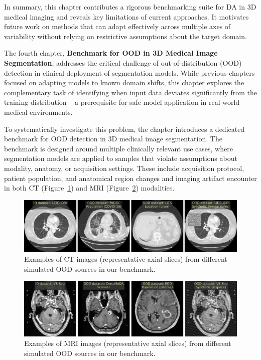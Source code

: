 In summary, this chapter contributes a rigorous benchmarking suite for DA in 3D medical imaging and reveals key limitations of current approaches. It motivates future work on methods that can adapt effectively across multiple axes of variability without relying on restrictive assumptions about the target domain.




The fourth chapter, \textbf{Benchmark for OOD in 3D Medical Image Segmentation}, addresses the critical challenge of out-of-distribution (OOD) detection in clinical deployment of segmentation models. While previous chapters focused on adapting models to known domain shifts, this chapter explores the complementary task of identifying when input data deviates significantly from the training distribution -- a prerequisite for safe model application in real-world medical environments.

To systematically investigate this problem, the chapter introduces a dedicated benchmark for OOD detection in 3D medical image segmentation. The benchmark is designed around multiple clinically relevant use cases, where segmentation models are applied to samples that violate assumptions about modality, anatomy, or acquisition settings. These include acquisition protocol, patient population, and anatomical region changes and imaging artifact encounter in both CT (Figure~\ref{fig:ct}) and MRI (Figure~\ref{fig:mri}) modalities.

\begin{figure}[h]
	\centering
	\includegraphics[width=\textwidth]{Dissertation/Figures/5_ood_bench/ct_examples_2.pdf}
	\caption{Examples of CT images (representative axial slices) from different simulated OOD sources in our benchmark.}
	\label{fig:ct}
\end{figure}

\begin{figure}[h]
	\centering
	\includegraphics[width=\textwidth]{Dissertation/Figures/5_ood_bench/mri_examples_2.pdf}
	\caption{Examples of MRI images (representative axial slices) from different simulated OOD sources in our benchmark.}
	\label{fig:mri}
\end{figure}

